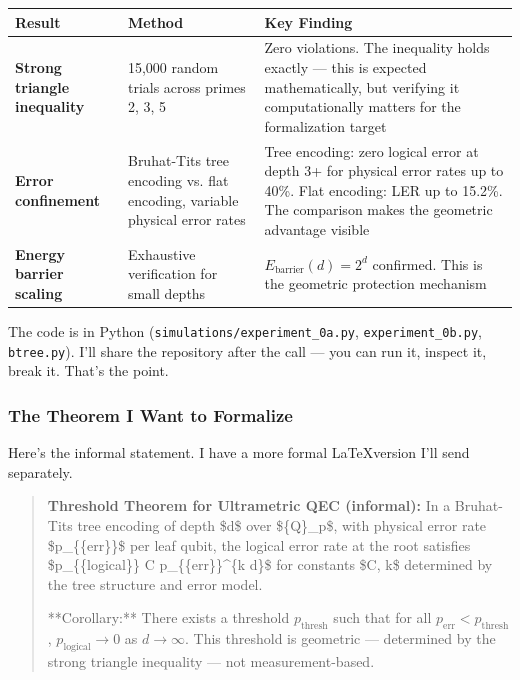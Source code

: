 \documentclass[11pt,a4paper]{article}
\begin{document}
\begin{center}
\begin{longtable}{|l|l|l|}
\hline
\textbf{Result} & \textbf{Method} & \textbf{Key Finding} \\ \hline
\endhead
\textbf{Strong triangle inequality} & 15,000 random trials across primes 2, 3, 5 & Zero violations. The inequality holds exactly — this is expected mathematically, but verifying it computationally matters for the formalization target \\ \hline
\textbf{Error confinement} & Bruhat-Tits tree encoding vs. flat encoding, variable physical error rates & Tree encoding: zero logical error at depth 3+ for physical error rates up to 40\%. Flat encoding: LER up to 15.2\%. The comparison makes the geometric advantage visible \\ \hline
\textbf{Energy barrier scaling} & Exhaustive verification for small depths & $E_{\text{barrier}}(d) = 2^d$ confirmed. This is the geometric protection mechanism \\ \hline
\end{longtable}
\end{center}

The code is in Python (\texttt{simulations/experiment\_0a.py}, \texttt{experiment\_0b.py}, \texttt{btree.py}). I'll share the repository after the call — you can run it, inspect it, break it. That's the point.

\subsubsection*{The Theorem I Want to Formalize}

Here's the informal statement. I have a more formal \LaTeX version I'll send separately.

\begin{quote}
\textbf{Threshold Theorem for Ultrametric QEC (informal):}
In a Bruhat-Tits tree encoding of depth \$d\$ over \$\mathbb\{Q\}\_p\$, with physical error rate \$p\_\{\text\{err\}\}\$ per leaf qubit, the logical error rate at the root satisfies \$p\_\{\text\{logical\}\} \leq C \cdot p\_\{\text\{err\}\}\^{}\{k \cdot d\}\$ for constants \$C, k\$ determined by the tree structure and error model.\par
**Corollary:** There exists a threshold $p_{\text{thresh}}$ such that for all $p_{\text{err}} < p_{\text{thresh}}$, $p_{\text{logical}} \to 0$ as $d \to \infty$. This threshold is geometric — determined by the strong triangle inequality — not measurement-based.\par
\end{quote}
\end{document}

